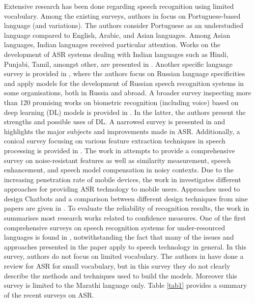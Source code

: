 Extensive research has been done regarding speech recognition using limited vocabulary. Among the existing surveys, authors in  focus on Portuguese-based language (and variations). The authors consider Portuguese as an understudied language compared to English, Arabic, and Asian languages. Among Asian languages, Indian languages received particular attention. Works on the development of ASR systems dealing with Indian languages such as Hindi, Punjabi, Tamil, amongst other, are presented in . Another specific language survey is provided in , where the authors focus on Russian language specificities and apply models for the development of Russian speech recognition systems in some organisations, both in Russia and abroad. A broader survey inspecting more than 120 promising works on biometric recognition (including voice) based on deep learning (DL) models is provided in . In the latter, the authors present the strengths and possible uses of DL. A narrowed survey is presented in  and highlights the major subjects and improvements made in ASR. Additionally, a conical survey focusing on various feature extraction techniques in speech processing is provided in . The work in  attempts to provide a comprehensive survey on noise-resistant features as well as similarity measurement, speech enhancement, and speech model compensation in noisy contexts. Due to the increasing penetration rate of mobile devices, the work in  investigates different approaches for providing ASR technology to mobile users. Approaches used to design Chatbots and a comparison between different design techniques from nine papers are given in . To evaluate the reliability of recognition results, the work in  summarises most research works related to confidence measures. One of the first comprehensive surveys on speech recognition systems for under-resourced languages is found in , notwithstanding the fact that many of the issues and approaches presented in the  paper apply to speech technology in general. In this survey, authors do not focus on limited vocabulary. The authors in  have done a review for ASR for small vocabulary, but in this survey they do not clearly describe the methods and techniques used to build the models. Moreover this survey is limited to the Marathi language only. Table \ref{tab1} provides a summary of the recent surveys on ASR.
